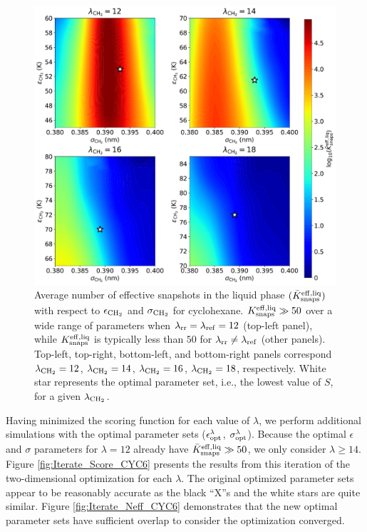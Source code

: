 \documentclass[journal=jced,manuscript=article]{achemso}
\begin{document}
	\begin{figure}[htb!]
		\centering
		\includegraphics[width=6.4in]{CYC6_Neff_lam.pdf}
		\caption{Average number of effective snapshots in the liquid phase $(\bar K_{\rm snaps}^{\rm eff, liq})$ with respect to $\epsilon_{\rm CH_2}$ and $\sigma_{\rm CH_2}$ for cyclohexane. $K_{\rm snaps}^{\rm eff, liq} \gg 50$ over a wide range of parameters when $\lambda_{\rm rr} = \lambda_{\rm ref} = 12$ (top-left panel), while $K_{\rm snaps}^{\rm eff, liq}$ is typically less than $50$ for $\lambda_{\rm rr} \neq \lambda_{\rm ref}$ (other panels). Top-left, top-right, bottom-left, and bottom-right panels correspond $\lambda_{\rm CH_2} = 12$, $\lambda_{\rm CH_2} = 14$, $\lambda_{\rm CH_2} = 16$, $\lambda_{\rm CH_2} = 18$, respectively. White star represents the optimal parameter set, i.e., the lowest value of $S$, for a given $\lambda_{\rm CH_2}$.}
		\label{fig:Neff_CYC6}
	\end{figure}

Having minimized the scoring function for each value of $\lambda$, we perform additional simulations with the optimal parameter sets ($\epsilon_{\rm opt}^{\lambda}$, $\sigma_{\rm opt}^{\lambda}$). Because the optimal $\epsilon$ and $\sigma$ parameters for $\lambda = 12$ already have $\bar K_{\rm snaps}^{\rm eff, liq} \gg 50$, we only consider $\lambda \ge 14$. Figure \ref{fig:Iterate_Score_CYC6} presents the results from this iteration of the two-dimensional optimization for each $\lambda$. The original optimized parameter sets appear to be reasonably accurate as the black ``X''s and the white stars are quite similar. Figure \ref{fig:Iterate_Neff_CYC6} demonstrates that the new optimal parameter sets have sufficient overlap to consider the optimization converged. 
\end{document}
